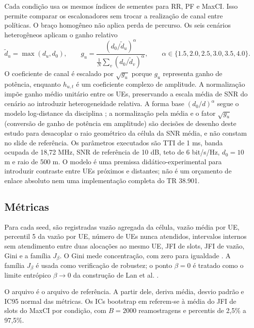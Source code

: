 \documentclass[12pt]{article}
\begin{document}
Cada condição usa os mesmos índices de sementes para RR, PF e MaxCI. Isso permite comparar os escalonadores sem trocar a realização de canal entre políticas. O braço homogêneo não aplica perda de percurso. Os seis cenários heterogêneos aplicam o ganho relativo
\begin{equation}
\tilde d_u=\max(d_u,d_0),\qquad
g_u=\frac{(d_0/\tilde d_u)^\alpha}{\frac{1}{N}\sum_v(d_0/\tilde d_v)^\alpha},
\qquad \alpha\in\{1.5,2.0,2.5,3.0,3.5,4.0\}.
\end{equation}
O coeficiente de canal é escalado por $\sqrt{g_u}$ porque $g_u$ representa ganho de potência, enquanto $h_{u,t}$ é um coeficiente complexo de amplitude. A normalização impõe ganho médio unitário entre os UEs, preservando a escala média de SNR do cenário ao introduzir heterogeneidade relativa. A forma base $(d_0/d)^\alpha$ segue o modelo log-distance da disciplina \cite{equacaodidaticapathloss}; a normalização pela média e o fator $\sqrt{g_u}$ (conversão de ganho de potência em amplitude) são decisões de desenho deste estudo para desacoplar o raio geométrico da célula da SNR média, e não constam no slide de referência. Os parâmetros executados são TTI de 1 ms, banda ocupada de 18,72 MHz, SNR de referência de 10 dB, teto de 6 bit/s/Hz, $d_0=10$ m e raio de 500 m. O modelo é uma premissa didático-experimental para introduzir contraste entre UEs próximos e distantes; não é um orçamento de enlace absoluto nem uma implementação completa do TR 38.901.

\subsection{Métricas}

Para cada seed, são registradas vazão agregada da célula, vazão média por UE, percentil 5 da vazão por UE, número de UEs nunca atendidos, intervalos internos sem atendimento entre duas alocações ao mesmo UE, JFI de slots, JFI de vazão, Gini e a família $J_\beta$. O Gini mede concentração, com zero para igualdade \cite{SHI20051925}. A família $J_\beta$ é usada como verificação de robustez; o ponto $\beta=0$ é tratado como o limite entrópico $\beta\to0$ da construção de Lan et al. \cite{lan2009axiomatictheoryfairnessnetwork}.

O arquivo  é o arquivo de referência. A partir dele,  deriva média, desvio padrão e IC95 normal das métricas. Os ICs bootstrap em  referem-se à média do JFI de slots do MaxCI por condição, com $B=2000$ reamostragens e percentis de 2,5\% a 97,5\%.
\end{document}
